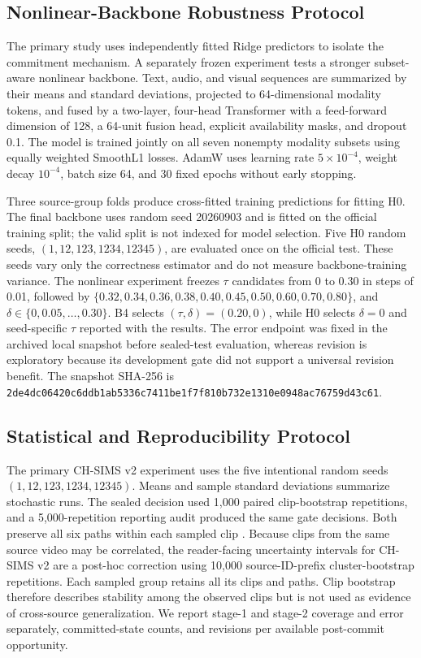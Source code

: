 \documentclass[journal]{IEEEtran}
\begin{document}
\subsection{Nonlinear-Backbone Robustness Protocol}

The primary study uses independently fitted Ridge predictors to isolate the commitment mechanism. A separately frozen experiment tests a stronger subset-aware nonlinear backbone. Text, audio, and visual sequences are summarized by their means and standard deviations, projected to 64-dimensional modality tokens, and fused by a two-layer, four-head Transformer with a feed-forward dimension of 128, a 64-unit fusion head, explicit availability masks, and dropout 0.1. The model is trained jointly on all seven nonempty modality subsets using equally weighted SmoothL1 losses. AdamW uses learning rate $5\times10^{-4}$, weight decay $10^{-4}$, batch size 64, and 30 fixed epochs without early stopping.

Three source-group folds produce cross-fitted training predictions for fitting H0. The final backbone uses random seed 20260903 and is fitted on the official training split; the valid split is not indexed for model selection. Five H0 random seeds, $(1,12,123,1234,12345)$, are evaluated once on the official test. These seeds vary only the correctness estimator and do not measure backbone-training variance. The nonlinear experiment freezes $\tau$ candidates from 0 to 0.30 in steps of 0.01, followed by $\{0.32,0.34,0.36,0.38,0.40,0.45,0.50,0.60,0.70,0.80\}$, and $\delta\in\{0,0.05,\ldots,0.30\}$. B4 selects $(\tau,\delta)=(0.20,0)$, while H0 selects $\delta=0$ and seed-specific $\tau$ reported with the results. The error endpoint was fixed in the archived local snapshot before sealed-test evaluation, whereas revision is exploratory because its development gate did not support a universal revision benefit. The snapshot SHA-256 is \texttt{2de4dc06420c6ddb\allowbreak{}1ab5336c7411be1f\allowbreak{}7f810b732e1310e0\allowbreak{}948ac76759d43c61}.

\subsection{Statistical and Reproducibility Protocol}

The primary CH-SIMS v2 experiment uses the five intentional random seeds $(1,12,123,1234,12345)$. Means and sample standard deviations summarize stochastic runs. The sealed decision used 1,000 paired clip-bootstrap repetitions, and a 5,000-repetition reporting audit produced the same gate decisions. Both preserve all six paths within each sampled clip \cite{efron1994bootstrap}. Because clips from the same source video may be correlated, the reader-facing uncertainty intervals for CH-SIMS v2 are a post-hoc correction using 10,000 source-ID-prefix cluster-bootstrap repetitions. Each sampled group retains all its clips and paths. Clip bootstrap therefore describes stability among the observed clips but is not used as evidence of cross-source generalization. We report stage-1 and stage-2 coverage and error separately, committed-state counts, and revisions per available post-commit opportunity.
\end{document}

